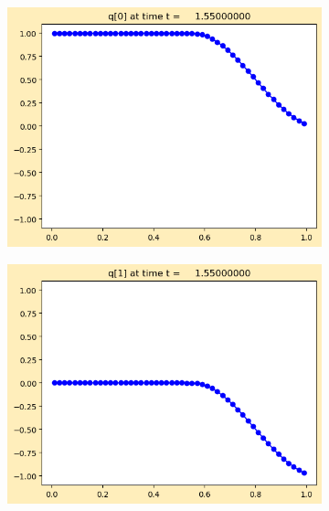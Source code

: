 \documentclass{article}
\begin{document}
\begin{figure}[H]
\begin{subfigure}{0.495\linewidth}
		\includegraphics[width=\linewidth]{standing/_plots/frame0031fig0.png}
	\end{subfigure}
	\begin{subfigure}{0.495\linewidth}
		\centering
		\includegraphics[width=\linewidth]{standing/_plots/frame0031fig1.png}
	\end{subfigure}
\end{figure}
\end{document}
